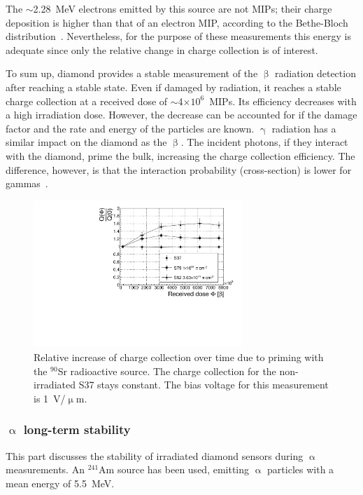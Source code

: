 The $\sim$2.28~MeV electrons emitted by this source are not MIPs; their charge deposition is higher than that of an electron MIP, according to the Bethe-Bloch distribution~\cite{BETHE:00000}. Nevertheless, for the purpose of these measurements this energy is adequate since only the relative change in charge collection is of interest.

To sum up, diamond provides a stable measurement of the $\upbeta$ radiation detection after reaching a stable state. Even if damaged by radiation, it reaches a stable charge collection at a received dose of $\sim$4$\times10^6$~MIPs. Its efficiency decreases with a high irradiation dose. %
However, the decrease can be accounted for if the damage factor and the rate and energy of the particles are known. $\upgamma$ radiation has a similar impact on the diamond as the $\upbeta$. The incident photons, if they interact with the diamond, prime the bulk, increasing the charge collection efficiency. The difference, however, is that the interaction probability (cross-section) is lower for gammas~\cite{sarin2014comprehensive,Griesmayer20121997}.

\begin{figure}[!t]
\begin{center}
\includegraphics[width=0.7\textwidth]{03_measurement_results/plots/ccdpriming}
\caption{Relative increase of charge collection over time due to priming with the $^{90}$Sr radioactive source. The charge collection for the non-irradiated S37 stays constant. The bias voltage for this measurement is 1~V/$\upmu$m.}
\label{fig:ccincrease}
\end{center}
\end{figure}

\subsubsection{$\upalpha$ long-term stability}
This part discusses the stability of irradiated diamond sensors during $\upalpha$ measurements. An $^{241}$Am source has been used, emitting $\upalpha$ particles with a mean energy of 5.5~MeV. 

